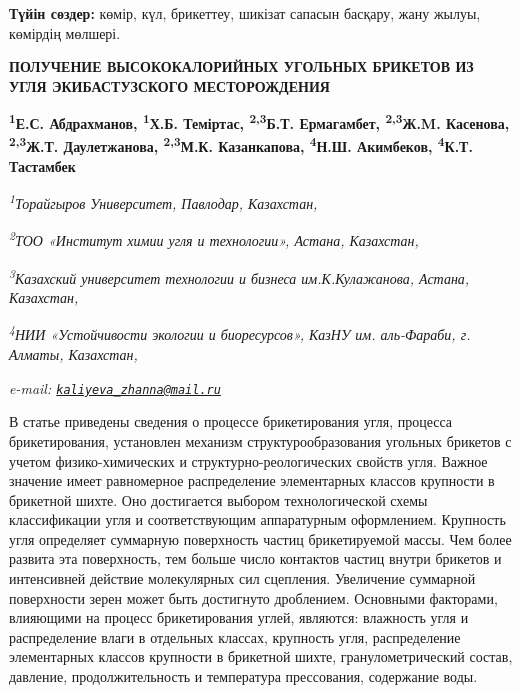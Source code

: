 {\bfseries Түйін сөздер:} көмір, күл, брикеттеу, шикізат сапасын басқару,
жану жылуы, көмірдің мөлшері.

\begin{articleheader}
{\bfseries ПОЛУЧЕНИЕ ВЫСОКОКАЛОРИЙНЫХ УГОЛЬНЫХ БРИКЕТОВ ИЗ УГЛЯ ЭКИБАСТУЗСКОГО МЕСТОРОЖДЕНИЯ}

{\bfseries
\textsuperscript{1}Е.С. Абдрахманов,
\textsuperscript{1}Х.Б. Теміртас,
\textsuperscript{2,3}Б.Т. Ермагамбет,
\textsuperscript{2,3}Ж.M. Касенова,
\textsuperscript{2,3}Ж.Т. Даулетжанова\textsuperscript{\envelope },
\textsuperscript{2,3}М.К. Казанкапова,
\textsuperscript{4}Н.Ш. Акимбеков,
\textsuperscript{4}К.Т. Тастамбек}
\end{articleheader}

\begin{affiliation}
\emph{\textsuperscript{1}Торайгыров Университет, Павлодар, Казахстан,}

\emph{\textsuperscript{2}ТОО «Институт химии угля и технологии», Астана, Казахстан,}

\emph{\textsuperscript{3}Казахский университет технологии и бизнеса им.К.Кулажанова, Астана, Казахстан,}

\emph{\textsuperscript{4}НИИ «Устойчивости экологии и биоресурсов», КазНУ им. аль-Фараби, г. Алматы, Казахстан,}

\emph{e-mail: \href{mailto:kaliyeva_zhanna@mail.ru}{\nolinkurl{kaliyeva\_zhanna@mail.ru}}}
\end{affiliation}

В статье приведены сведения о процессе брикетирования угля, процесса
брикетирования, установлен механизм структурообразования угольных
брикетов с учетом физико-химических и структурно-реологических свойств
угля. Важное значение имеет равномерное распределение элементарных
классов крупности в брикетной шихте. Оно достигается выбором
технологической схемы классификации угля и соответствующим аппаратурным
оформлением. Крупность угля определяет суммарную поверхность частиц
брикетируемой массы. Чем более развита эта поверхность, тем больше число
контактов частиц внутри брикетов и интенсивней действие молекулярных сил
сцепления. Увеличение суммарной поверхности зерен может быть достигнуто
дроблением. Основными факторами, влияющими на процесс брикетирования
углей, являются: влажность угля и распределение влаги в отдельных
классах, крупность угля, распределение элементарных классов крупности в
брикетной шихте, гранулометрический состав, давление, продолжительность
и температура прессования, содержание воды.

